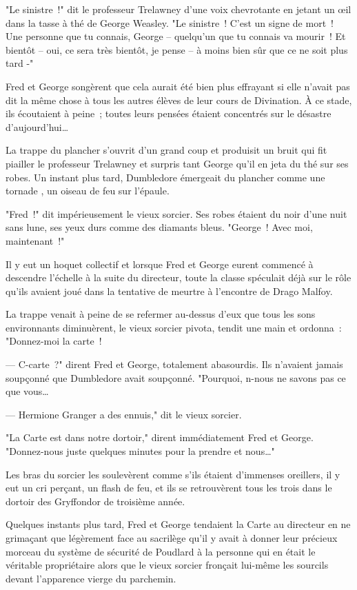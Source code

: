 "Le sinistre~!" dit le professeur Trelawney d'une voix chevrotante en jetant un œil dans la tasse à thé de George Weasley. "Le sinistre~! C'est un signe de mort~! Une personne que tu connais, George -- quelqu'un que tu connais va mourir~! Et bientôt -- oui, ce sera très bientôt, je pense -- à moins bien sûr que ce ne soit plus tard -"

Fred et George songèrent que cela aurait été bien plus effrayant si elle n'avait pas dit la même chose à tous les autres élèves de leur cours de Divination. À ce stade, ils écoutaient à peine~; toutes leurs pensées étaient concentrés sur le désastre d'aujourd'hui…

La trappe du plancher s'ouvrit d'un grand coup et produisit un bruit qui fit piailler le professeur Trelawney et surpris tant George qu'il en jeta du thé sur ses robes. Un instant plus tard, Dumbledore émergeait du plancher comme une tornade , un oiseau de feu sur l'épaule.

"Fred~!" dit impérieusement le vieux sorcier. Ses robes étaient du noir d'une nuit sans lune, ses yeux durs comme des diamants bleus. "George~! Avec moi, maintenant~!"

Il y eut un hoquet collectif et lorsque Fred et George eurent commencé à descendre l'échelle à la suite du directeur, toute la classe spéculait déjà sur le rôle qu'ils avaient joué dans la tentative de meurtre à l'encontre de Drago Malfoy.

La trappe venait à peine de se refermer au-dessus d'eux que tous les sons environnants diminuèrent, le vieux sorcier pivota, tendit une main et ordonna~: "Donnez-moi la carte~!

--- C-carte~?" dirent Fred et George, totalement abasourdis. Ils n'avaient jamais soupçonné que Dumbledore avait soupçonné. "Pourquoi, n-nous ne savons pas ce que vous…

--- Hermione Granger a des ennuis," dit le vieux sorcier.

"La Carte est dans notre dortoir," dirent immédiatement Fred et George. "Donnez-nous juste quelques minutes pour la prendre et nous…"

Les bras du sorcier les soulevèrent comme s'ils étaient d'immenses oreillers, il y eut un cri perçant, un flash de feu, et ils se retrouvèrent tous les trois dans le dortoir des Gryffondor de troisième année.

Quelques instants plus tard, Fred et George tendaient la Carte au directeur en ne grimaçant que légèrement face au sacrilège qu'il y avait à donner leur précieux morceau du système de sécurité de Poudlard à la personne qui en était le véritable propriétaire alors que le vieux sorcier fronçait lui-même les sourcils devant l'apparence vierge du parchemin.

